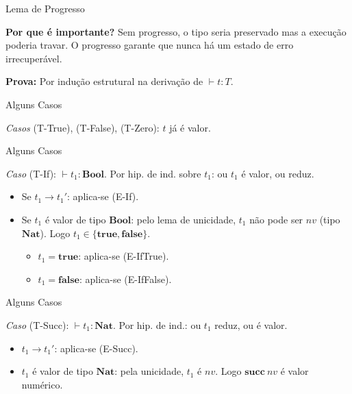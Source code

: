 \begin{frame}{Lema de Progresso}

    \textbf{Por que é importante?} Sem progresso, o tipo seria preservado
    mas a execução poderia travar. O progresso garante que nunca há um
    estado de erro irrecuperável.

    \textbf{Prova:} Por indução estrutural na derivação de \(\vdash t : T\).
\end{frame}

\begin{frame}{Alguns Casos}

    \emph{Casos} (T-True), (T-False), (T-Zero): \(t\) já é valor. \checkmark{}
\end{frame}

\begin{frame}{Alguns Casos}

    \emph{Caso} (T-If): \(\vdash t_1 : \mathbf{Bool}\). Por hip. de ind.
    sobre \(t_1\): ou \(t_1\) é valor, ou reduz.

    \begin{itemize}

        \item
        Se \(t_1 \to t_1'\): aplica-se (E-If). \checkmark{}
        \item
        Se \(t_1\) é valor de tipo \(\mathbf{Bool}\): pelo lema de unicidade,
        \(t_1\) não pode ser \(nv\) (tipo \(\mathbf{Nat}\)). Logo
        \(t_1 \in \{\mathbf{true}, \mathbf{false}\}\).

        \begin{itemize}

            \item
            \(t_1 = \mathbf{true}\): aplica-se (E-IfTrue). \checkmark{}
            \item
            \(t_1 = \mathbf{false}\): aplica-se (E-IfFalse). \checkmark{}
        \end{itemize}
    \end{itemize}
\end{frame}

\begin{frame}{Alguns Casos}

    \emph{Caso} (T-Succ): \(\vdash t_1 : \mathbf{Nat}\). Por hip. de ind.:
    ou \(t_1\) reduz, ou é valor.

    \begin{itemize}

        \item
        \(t_1 \to t_1'\): aplica-se (E-Succ). \checkmark{}
        \item
        \(t_1\) é valor de tipo \(\mathbf{Nat}\): pela unicidade, \(t_1\) é
        \(nv\). Logo \(\mathbf{succ}\ nv\) é valor numérico. \checkmark{}
    \end{itemize}
\end{frame}

